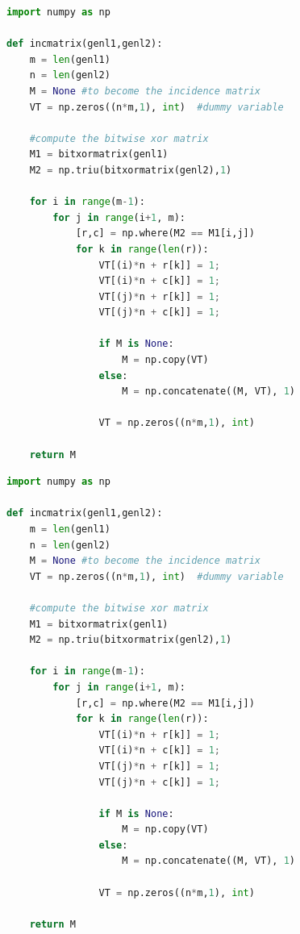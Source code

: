 \documentclass{article}
\begin{document}
\clearpage
\lstset{style=mystyle1}
\begin{lstlisting}[language=Python, caption=Python example 2]
import numpy as np
    
def incmatrix(genl1,genl2):
    m = len(genl1)
    n = len(genl2)
    M = None #to become the incidence matrix
    VT = np.zeros((n*m,1), int)  #dummy variable
    
    #compute the bitwise xor matrix
    M1 = bitxormatrix(genl1)
    M2 = np.triu(bitxormatrix(genl2),1) 

    for i in range(m-1):
        for j in range(i+1, m):
            [r,c] = np.where(M2 == M1[i,j])
            for k in range(len(r)):
                VT[(i)*n + r[k]] = 1;
                VT[(i)*n + c[k]] = 1;
                VT[(j)*n + r[k]] = 1;
                VT[(j)*n + c[k]] = 1;
                
                if M is None:
                    M = np.copy(VT)
                else:
                    M = np.concatenate((M, VT), 1)
                
                VT = np.zeros((n*m,1), int)
    
    return M
\end{lstlisting}
\clearpage

\lstset{style=mystyle2}
\begin{lstlisting}[language=Python, caption=Python example 3]
import numpy as np
    
def incmatrix(genl1,genl2):
    m = len(genl1)
    n = len(genl2)
    M = None #to become the incidence matrix
    VT = np.zeros((n*m,1), int)  #dummy variable
    
    #compute the bitwise xor matrix
    M1 = bitxormatrix(genl1)
    M2 = np.triu(bitxormatrix(genl2),1) 

    for i in range(m-1):
        for j in range(i+1, m):
            [r,c] = np.where(M2 == M1[i,j])
            for k in range(len(r)):
                VT[(i)*n + r[k]] = 1;
                VT[(i)*n + c[k]] = 1;
                VT[(j)*n + r[k]] = 1;
                VT[(j)*n + c[k]] = 1;
                
                if M is None:
                    M = np.copy(VT)
                else:
                    M = np.concatenate((M, VT), 1)
                
                VT = np.zeros((n*m,1), int)
    
    return M
\end{lstlisting}
\clearpage
\end{document}
